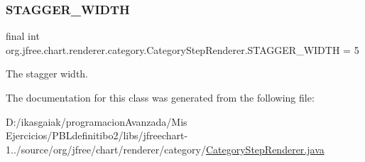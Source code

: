 \subsubsection{\texorpdfstring{S\+T\+A\+G\+G\+E\+R\+\_\+\+W\+I\+D\+TH}{STAGGER\_WIDTH}}
{\footnotesize\ttfamily final int org.\+jfree.\+chart.\+renderer.\+category.\+Category\+Step\+Renderer.\+S\+T\+A\+G\+G\+E\+R\+\_\+\+W\+I\+D\+TH = 5\hspace{0.3cm}{\ttfamily [static]}}

The stagger width. 

The documentation for this class was generated from the following file\+:\begin{DoxyCompactItemize}
\item 
D\+:/ikasgaiak/programacion\+Avanzada/\+Mis Ejercicios/\+P\+B\+Ldefinitibo2/libs/jfreechart-\/1../source/org/jfree/chart/renderer/category/\mbox{\hyperlink{_category_step_renderer_8java}{Category\+Step\+Renderer.\+java}}\end{DoxyCompactItemize}
